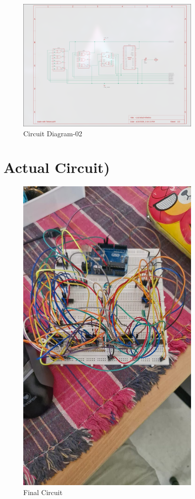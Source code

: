 \documentclass[a4paper,12pt]{article}
\begin{document}
\begin{figure}[H]
    \centering
    \includegraphics[width=0.8\textwidth]{figs/scheme2.png}
    \caption{Circuit Diagram-02}
    \label{fig:your_image_label}
\end{figure}
\section{Actual Circuit)}
\begin{figure}[H]
    \centering
    \includegraphics[width=0.8\textwidth]{figs/fig.png}
    \caption{Final Circuit}
    \label{fig:your_image_label}
\end{figure}
\end{document}
